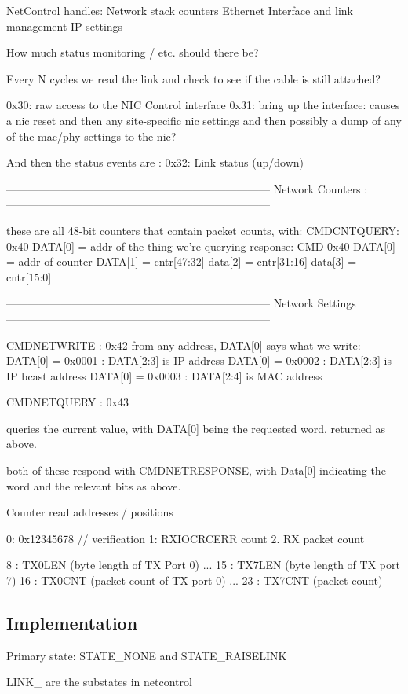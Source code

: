 NetControl handles: 
   Network stack counters
   Ethernet Interface and link management
   IP settings


How much status monitoring / etc. should there be? 

Every N cycles we read the link and check to see if the cable
is still attached? 

0x30: raw access to the NIC Control interface
0x31: bring up the interface:
    causes a nic reset
    and then any site-specific nic settings
    and then possibly a dump of any of the mac/phy settings to the nic? 

And then the status events are : 
0x32: Link status (up/down)


------------------------------------------------------------------------
Network Counters : 
------------------------------------------------------------------------

these are all 48-bit counters that contain packet counts, with: 
CMDCNTQUERY: 0x40
DATA[0] = addr of the thing we're querying
response: CMD 0x40
DATA[0] = addr of counter
DATA[1] = cntr[47:32]
data[2] = cntr[31:16]
data[3] = cntr[15:0]




------------------------------------------------------------------------
Network Settings
------------------------------------------------------------------------

CMDNETWRITE : 0x42
from any address, DATA[0] says what we write:
    DATA[0] = 0x0001 : DATA[2:3] is IP address
    DATA[0] = 0x0002 : DATA[2:3] is IP bcast address
    DATA[0] = 0x0003 : DATA[2:4] is MAC address

CMDNETQUERY : 0x43

queries the current value, with DATA[0] being the requested word,
returned as above.

both of these respond with CMDNETRESPONSE, with Data[0] indicating
the word and the relevant bits as above. 

Counter read addresses / positions

0: 0x12345678 // verification
1: RXIOCRCERR count
2. RX packet count

8 : TX0LEN (byte length of TX Port 0)
...
15 : TX7LEN (byte length of TX port 7)
16 : TX0CNT (packet count of TX port 0)
...
23 : TX7CNT (packet count)


\subsection{Implementation}

Primary state: STATE_NONE and STATE_RAISELINK

LINK_ are the substates in netcontrol
